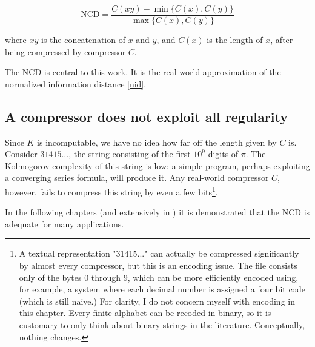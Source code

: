 \begin{equation}\label{ncd}
  \text{NCD} = \frac{C(xy) - \min \{ C(x), C(y) \}}{\max \{ C(x), C(y) \}}
\end{equation}

where $xy$ is the concatenation of $x$ and $y$, and $C(x)$ is the length of $x$, after being compressed by compressor $C$.

The $\text{NCD}$ is central to this work. It is the real-world approximation of the normalized information distance \eqref{nid}.

\subsection{A compressor does not exploit all regularity}
Since $K$ is incomputable, we have no idea how far off the length given by $C$ is. Consider $31415...$, the string consisting of the first $10^{9}$ digits of $\pi$. The Kolmogorov complexity of this string is low: a simple program, perhaps exploiting a converging series formula, will produce it. Any real-world compressor $C$, however, fails to compress this string by even a few bits\footnote{A textual representation "31415..." can actually be compressed significantly by almost every compressor, but this is an encoding issue. The file consists only of the bytes 0 through 9, which can be more efficiently encoded using, for example, a system where each decimal number is assigned a four bit code (which is still naive.) For clarity, I do not concern myself with encoding in this chapter. Every finite alphabet can be recoded in binary, so it is customary to only think about binary strings in the literature. Conceptually, nothing changes. }.

In the following chapters (and extensively in \cite{Cilibrasi2005}) it is demonstrated that the $\text{NCD}$ is adequate for many applications.
